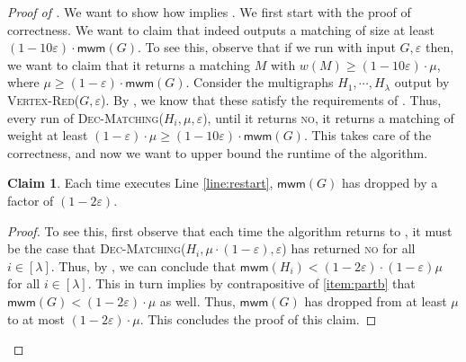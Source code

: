 \documentclass[a4paper,11pt]{article}
\newcommand{\eps}{\varepsilon}
\theoremstyle{definition}
\theoremstyle{definition}
\theoremstyle{definition}
\theoremstyle{definition}
\theoremstyle{definition}
\theoremstyle{definition}
\theoremstyle{definition}
\theoremstyle{definition}
\newtheorem{claim2}[definition2]{Claim}
\theoremstyle{definition}
\theoremstyle{definition}
\theoremstyle{definition}
\theoremstyle{definition}
\theoremstyle{definition}
\theoremstyle{definition}
\theoremstyle{definition}
\begin{document}
\begin{proof}[Proof of ]
We want to show how  implies . We first start with the proof of correctness. We want to claim that  indeed outputs a matching of size at least $(1-10\eps)\cdot \textsf{mwm}(G)$. To see this, observe that if we run  with input $G,\eps$ then, we want to claim that it returns a matching $M$ with $w(M)\geqslant (1-10\eps)\cdot \mu$, where $\mu\geqslant (1-\eps)\cdot \textsf{mwm}(G)$. Consider the multigraphs $H_1,\cdots,H_{\lambda}$ output by \textsc{Vertex-Red}($G,\eps$). By , we know that these satisfy the requirements of . Thus, every run of \textsc{Dec-Matching}($H_i,\mu,\eps$), until it returns \textsc{no}, it returns a matching of weight at least $(1-\eps)\cdot \mu\geqslant (1-10\eps)\cdot \textsf{mwm}(G)$.  This takes care of the correctness, and now we want to upper bound the runtime of the algorithm.

\begin{claim2}
Each time  executes Line \ref{line:restart}, $\textsf{mwm}(G)$ has dropped by a factor of $(1-2\eps)$.
\end{claim2}
\begin{proof}
To see this, first observe that each time the algorithm returns to , it must be the case that \textsc{Dec-Matching}($H_i,\mu\cdot (1-\eps),\eps$) has returned \textsc{no} for all $i\in [\lambda]$. Thus, by , we can conclude that $\textsf{mwm}(H_i)<(1-2\eps)\cdot (1-\eps)\mu$ for all $i\in [\lambda]$. This in turn implies by contrapositive of \ref{item:partb} that $\textsf{mwm}(G)<(1-2\eps)\cdot \mu$ as well. Thus, $\textsf{mwm}(G)$ has dropped from at least $\mu$ to at most $(1-2\eps)\cdot \mu$. This concludes the proof of this claim. 
\end{proof}


\end{proof}
\end{document}

